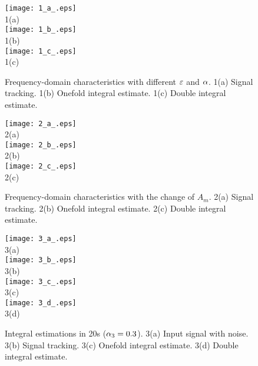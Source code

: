 \documentclass[10pt,journal]{IEEEtran}
\begin{document}
\begin{figure}[H]
\begin{center}
\texttt{[image: 1\_a\_.eps]}\\[0pt]
{\small 1(a)}\\[0pt]
\texttt{[image: 1\_b\_.eps]}\\[0pt]
{\small 1(b)}\\[0pt]
\texttt{[image: 1\_c\_.eps]}\\[0pt]
{\small 1(c)}
\end{center}
\caption{Frequency-domain characteristics with different $\protect \varepsilon $ and $\protect\alpha$. 1(a) Signal tracking. 1(b) Onefold
integral estimate. 1(c) Double integral estimate.}
\end{figure}

\begin{figure}[H]
\begin{center}
\texttt{[image: 2\_a\_.eps]}\\[0pt]
{\small 2(a)}\\[0pt]
\texttt{[image: 2\_b\_.eps]}\\[0pt]
{\small 2(b)}\\[0pt]
\texttt{[image: 2\_c\_.eps]}\\[0pt]
{\small 2(c)}
\end{center}
\caption{Frequency-domain characteristics with the change of $A_{m}$. 2(a)
Signal tracking. 2(b) Onefold integral estimate. 2(c) Double integral
estimate.}
\end{figure}

\begin{figure}[H]
\begin{center}
\texttt{[image: 3\_a\_.eps]}\\[0pt]
{\small 3(a)}\\[0pt]
\texttt{[image: 3\_b\_.eps]}\\[0pt]
{\small 3(b)}\\[0pt]
\texttt{[image: 3\_c\_.eps]}\\[0pt]
{\small 3(c)}\\[0pt]
\texttt{[image: 3\_d\_.eps]}\\[0pt]
{\small 3(d)}
\end{center}
\caption{Integral estimations in 20s ($\protect\alpha _{3}=0.3$). 3(a) Input
signal with noise. 3(b) Signal tracking. 3(c) Onefold integral estimate. 3(d)
Double integral estimate.}
\end{figure}
\end{document}
